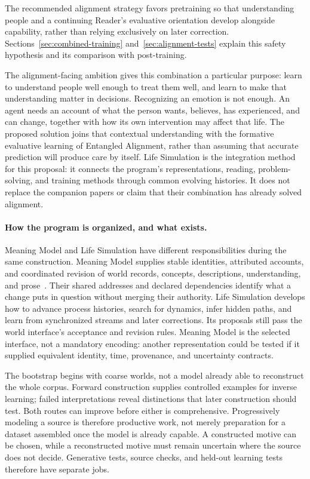 \documentclass[10pt]{article}
\begin{document}
The recommended alignment strategy favors pretraining so
that understanding people and a continuing Reader's evaluative orientation
develop alongside capability, rather than relying exclusively on later
correction. Sections~\ref{sec:combined-training} and~\ref{sec:alignment-tests} explain this safety
hypothesis and its comparison with post-training.

The alignment-facing ambition gives this combination a particular purpose:
learn to understand people well enough to treat them well, and learn to make
that understanding matter in decisions. Recognizing an emotion is not enough.
An agent needs an account of what the person wants, believes, has experienced,
and can change, together with how its own intervention may affect that life.
The proposed solution joins that contextual understanding with the formative
evaluative learning of Entangled Alignment, rather than assuming that accurate
prediction will produce care by itself. Life Simulation is the integration
method for this proposal: it connects the program's representations, reading,
problem-solving, and training methods through common evolving histories.
It does not replace the companion papers or claim that their combination has
already solved alignment.

\paragraph{How the program is organized, and what exists.}
Meaning Model and Life Simulation have different responsibilities during the
same construction. Meaning Model supplies stable identities, attributed
accounts, and coordinated revision of world records, concepts, descriptions,
understanding, and prose~\cite{westerbergMeaning2026}. Their shared addresses
and declared dependencies identify what a change puts in question without
merging their authority. Life Simulation develops how to advance process
histories, search for dynamics, infer hidden paths, and learn from synchronized
streams and later corrections. Its proposals still pass the world interface's
acceptance and revision rules. Meaning Model is the selected interface, not a
mandatory encoding: another representation could be tested if it supplied
equivalent identity, time, provenance, and uncertainty contracts.

The bootstrap begins with coarse worlds, not a model already able to
reconstruct the whole corpus. Forward construction supplies controlled examples
for inverse learning; failed interpretations reveal distinctions that later
construction should test. Both routes can improve before either is
comprehensive. Progressively modeling a source is therefore productive work,
not merely preparation for a dataset assembled once the model is already
capable. A constructed motive can be chosen, while a reconstructed motive
must remain uncertain where the source does not decide. Generative tests,
source checks, and held-out learning tests therefore have separate jobs.
\end{document}
